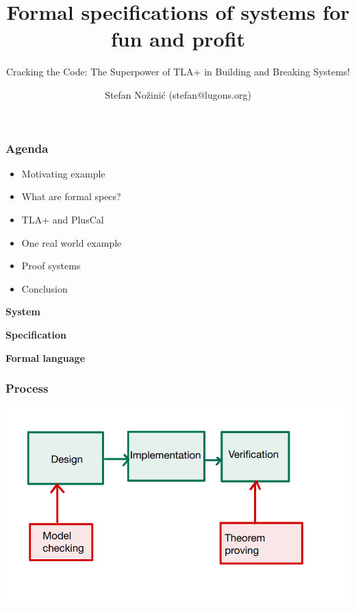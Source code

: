 \documentclass{beamer}
\begin{document}
\title{Formal specifications of systems for fun and profit}
\subtitle{Cracking the Code: The Superpower of TLA+ in Building and Breaking Systems!}
\author{Stefan Nožinić (stefan@lugons.org)}

\frame{
\titlepage
}

\begin{frame}
    \frametitle{Agenda}
    \begin{itemize}
        \item Motivating example
        \item What are formal specs? 
        \item TLA+ and PlusCal
        \item One real world example
        \item Proof systems 
        \item Conclusion
    \end{itemize}

\end{frame}


\begin{frame}
    \begin{center}
        \LARGE{\textbf{System}}
    \end{center}
\end{frame}



\begin{frame}
    \begin{center}
        \LARGE{\textbf{Specification}}
    \end{center}
\end{frame}



\begin{frame}
    \begin{center}
        \LARGE{\textbf{Formal language}}
    \end{center}
\end{frame}

\begin{frame}
    \frametitle{Process}
    \includegraphics[width=\textwidth]{img/2.png}
\end{frame}
\end{document}
